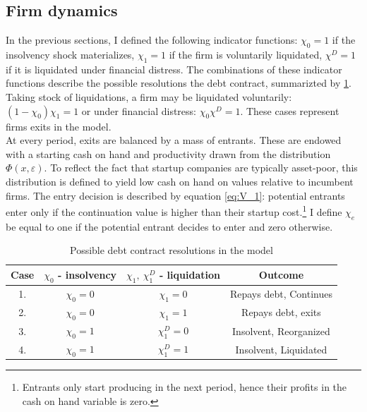 \documentclass[12pt]{article}
\begin{document}
\subsection{Firm dynamics}
In the previous sections, I defined the following indicator functions: $\chi_0 = 1$ if the insolvency shock materializes, $\chi_1 = 1$ if the firm is voluntarily liquidated, $\chi^D = 1$ if it is liquidated under financial distress. The combinations of these indicator functions describe the possible resolutions the debt contract, summarizted by \ref{table:indic}. Taking stock of liquidations, a firm may be liquidated voluntarily: $(1-\chi_0)\chi_1 = 1$ or under financial distress: $\chi_0\chi^D = 1$. These cases represent firms exits in the model. \vspace{3mm}\\
At every period, exits are balanced by a mass of entrants. These are endowed with a starting cash on hand and productivity drawn from the distribution $\Phi(x,\varepsilon)$. To reflect the fact that startup companies are typically asset-poor, this distribution is defined to yield low cash on hand on values relative to incumbent firms. The entry decision is described by equation \ref{eq:V_1}: potential entrants enter only if the continuation value is higher than their startup cost.\footnote{Entrants only start producing in the next period, hence their profits in the cash on hand variable is zero.} I define $\chi_e$ be equal to one if the potential entrant decides to enter and zero otherwise. 

\begin{table}[h!]
    \centering
    \begin{tabular}{|c|c|c|c|} 
    \hline
    Case &$\chi_0 $ - insolvency & $\chi_1, \ \chi_1^D$ - liquidation &  Outcome  \\ \hline
    1. & $\chi_0 = 0 $ &  $\chi_1 = 0$  & Repays debt, Continues \\
    2. & $\chi_0 = 0$ &  $\chi_1 = 1 $  & Repays debt, exits   \\
    3. & $\chi_0 = 1$ &  $\chi_1^D = 0$  & Insolvent, Reorganized  \\
    4. & $\chi_0 = 1$ &  $\chi_1^D = 1$ & Insolvent, Liquidated \\ 
    \hline
    \end{tabular}
    \caption{Possible debt contract resolutions in the model}
    \label{table:indic}
\end{table}
    
\end{document}

